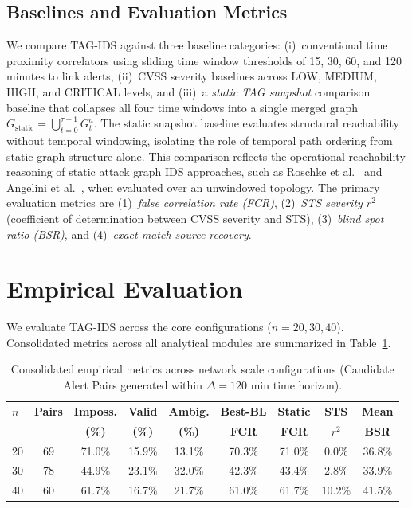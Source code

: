 \documentclass[runningheads]{llncs}
\begin{document}
\subsection{Baselines and Evaluation Metrics}
We compare TAG-IDS against three baseline categories: (i)~conventional time proximity correlators using sliding time window thresholds of 15, 30, 60, and 120 minutes to link alerts, (ii)~CVSS severity baselines across LOW, MEDIUM, HIGH, and CRITICAL levels, and (iii)~a \emph{static TAG snapshot} comparison baseline that collapses all four time windows into a single merged graph $G_{\text{static}} = \bigcup_{t=0}^{\tau-1} G_t^a$. The static snapshot baseline evaluates structural reachability without temporal windowing, isolating the role of temporal path ordering from static graph structure alone. This comparison reflects the operational reachability reasoning of static attack graph IDS approaches, such as Roschke et al.~\cite{Roschke2010} and Angelini et al.~\cite{Angelini2019}, when evaluated over an unwindowed topology. The primary evaluation metrics are (1)~\emph{false correlation rate (FCR)}, (2)~\emph{STS severity $r^2$} (coefficient of determination between CVSS severity and STS), (3)~\emph{blind spot ratio (BSR)}, and (4)~\emph{exact match source recovery}.

\section{Empirical Evaluation}
\label{sec:evaluation}

We evaluate TAG-IDS across the core configurations ($n=20, 30, 40$). Consolidated metrics across all analytical modules are summarized in Table~\ref{tab:summary}.

\begin{table}[t]
\centering
\caption{Consolidated empirical metrics across network scale configurations (Candidate Alert Pairs generated within $\Delta=120$ min time horizon).}
\label{tab:summary}
\footnotesize
\setlength{\tabcolsep}{3.5pt}
\begin{tabular}{lcccccccc}
\toprule
\textbf{$n$} & \textbf{Pairs} & \textbf{Imposs.} & \textbf{Valid} & \textbf{Ambig.} & \textbf{Best-BL} & \textbf{Static} & \textbf{STS} & \textbf{Mean} \\
 & & \textbf{(\%)} & \textbf{(\%)} & \textbf{(\%)} & \textbf{FCR} & \textbf{FCR} & \textbf{$r^2$} & \textbf{BSR} \\
\midrule
20 & 69 & 71.0\% & 15.9\% & 13.1\% & 70.3\% & 71.0\% & 0.0\% & 36.8\% \\
30 & 78 & 44.9\% & 23.1\% & 32.0\% & 42.3\% & 43.4\% & 2.8\% & 33.9\% \\
40 & 60 & 61.7\% & 16.7\% & 21.7\% & 61.0\% & 61.7\% & 10.2\% & 41.5\% \\
\bottomrule
\end{tabular}
\end{table}
\end{document}
